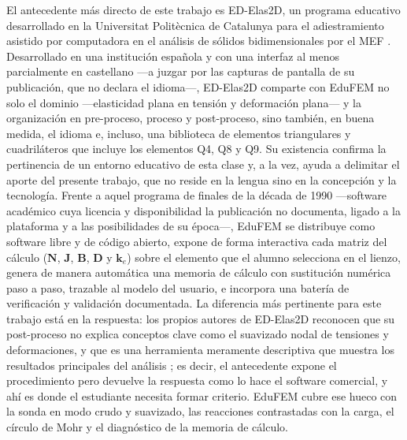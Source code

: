 El antecedente más directo de este trabajo es ED-Elas2D, un programa educativo desarrollado en la Universitat Politècnica de Catalunya para el adiestramiento asistido por computadora en el análisis de sólidos bidimensionales por el MEF \autocite{suarez1998edelas2d}. Desarrollado en una institución española y con una interfaz al menos parcialmente en castellano —a juzgar por las capturas de pantalla de su publicación, que no declara el idioma—, ED-Elas2D comparte con EduFEM no solo el dominio —elasticidad plana en tensión y deformación plana— y la organización en pre-proceso, proceso y post-proceso, sino también, en buena medida, el idioma e, incluso, una biblioteca de elementos triangulares y cuadriláteros que incluye los elementos Q4, Q8 y Q9. Su existencia confirma la pertinencia de un entorno educativo de esta clase y, a la vez, ayuda a delimitar el aporte del presente trabajo, que no reside en la lengua sino en la concepción y la tecnología. Frente a aquel programa de finales de la década de 1990 —software académico cuya licencia y disponibilidad la publicación no documenta, ligado a la plataforma y a las posibilidades de su época—, EduFEM se distribuye como software libre y de código abierto, expone de forma interactiva cada matriz del cálculo ($\bm{N}$, $\bm{J}$, $\bm{B}$, $\bm{D}$ y $\bm{k}_e$) sobre el elemento que el alumno selecciona en el lienzo, genera de manera automática una memoria de cálculo con sustitución numérica paso a paso, trazable al modelo del usuario, e incorpora una batería de verificación y validación documentada. La diferencia más pertinente para este trabajo está en la respuesta: los propios autores de ED-Elas2D reconocen que su post-proceso no explica conceptos clave como el suavizado nodal de tensiones y deformaciones, y que es una herramienta meramente descriptiva que muestra los resultados principales del análisis \autocite[p.~253]{suarez1998edelas2d}; es decir, el antecedente expone el procedimiento pero devuelve la respuesta como lo hace el software comercial, y ahí es donde el estudiante necesita formar criterio. EduFEM cubre ese hueco con la sonda en modo crudo y suavizado, las reacciones contrastadas con la carga, el círculo de Mohr y el diagnóstico de la memoria de cálculo.


